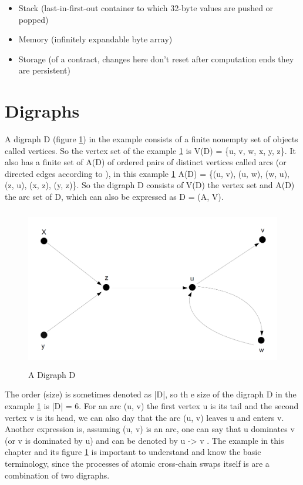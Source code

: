 \begin{itemize}
	\item Stack (last-in-first-out container to which 32-byte values are pushed or popped)
	\item Memory (infinitely expandable byte array)
	\item Storage (of a contract, changes here don't reset after computation ends they are persistent)
\end{itemize}


\clearpage


\section{Digraphs}
\label{sec:background:second_section}
A \ac{digraph} D (figure \ref{fig:a_digraph_d}) in the example consists of a finite nonempty set of objects called vertices. So the vertex set of the example \ref{fig:a_digraph_d} is V(D) = \{u, v, w, x, y, z\}. It also has a finite set of A(D) of ordered pairs of distinct vertices called arcs (or directed edges according to \cite{chartrand2010graphs}), in this example \ref{fig:a_digraph_d} A(D) = \{(u, v), (u, w), (w, u), (z, u), (x, z), (y, z)\}. So the \ac{digraph} D consists of V(D) the vertex set and A(D) the arc set of D, which can also be expressed as D = (A, V). \newline



\begin{figure}[h]
	\includegraphics[height=7cm]{adigraphd}	%
	\caption{A Digraph D}
	\label{fig:a_digraph_d}
\end{figure}


The order (size) is sometimes denoted as |D|, so th e size of the \ac{digraph} D in the example \ref{fig:a_digraph_d} is |D| = 6. For an arc (u, v) the first vertex u is its tail and the second vertex v is its head, we can also day that the arc (u, v) leaves u and enters v. Another expression is, assuming (u, v) is an arc, one can say that u dominates v (or v is dominated by u) and can be denoted by u -> v \cite{bang2007theory}. The example in this chapter and its figure \ref{fig:a_digraph_d} is important to understand and know the basic terminology, since the processes of atomic cross-chain swaps itself is are a combination of two digraphs.

